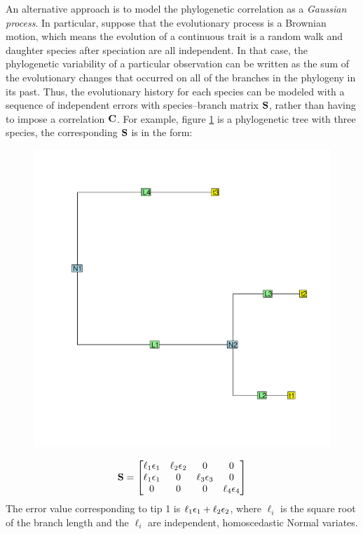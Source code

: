An alternative approach is to model the phylogenetic correlation as a \textit{Gaussian process}. 
In particular, suppose that the evolutionary process is a Brownian motion, which means the evolution of a continuous trait is a random walk and daughter species after speciation are all independent.  
In that case, the phylogenetic variability of a particular observation can be written as the sum of the evolutionary changes that occurred on all of the branches in the phylogeny in its past. 
Thus, the evolutionary history for each species can be modeled with a sequence of independent errors with species--branch matrix ${\mathbf S}$, rather than having to impose a correlation ${\mathbf C}$.
For example, figure \ref{fig:tree} is a phylogenetic tree with three species, the corresponding ${\mathbf S}$ is in the form:

\begin{center}
\begin{figure}[h]
  \includegraphics[scale=0.8,page=1]{./git_push/tree.pdf}
  \caption{}
\label{fig:tree}
\end{figure}
\end{center}

\begin{align*}
{\mathbf S} = \begin{bmatrix}
\ell_1 { \epsilon}_1 & \ell_2 { \epsilon}_2 & 0 & 0 \\
\ell_1 { \epsilon}_1 &  0 & \ell_3 { \epsilon}_3 & 0 \\
0  &  0 & 0  & \ell_4 { \epsilon}_4
\end{bmatrix}
\end{align*}
The error value corresponding to tip 1 is $\ell_1 { \epsilon}_1 + \ell_2 { \epsilon}_2$, where $\ell_i$ is the square root of the branch length and the $\ell_i$ are independent, homoscedastic Normal variates. 


